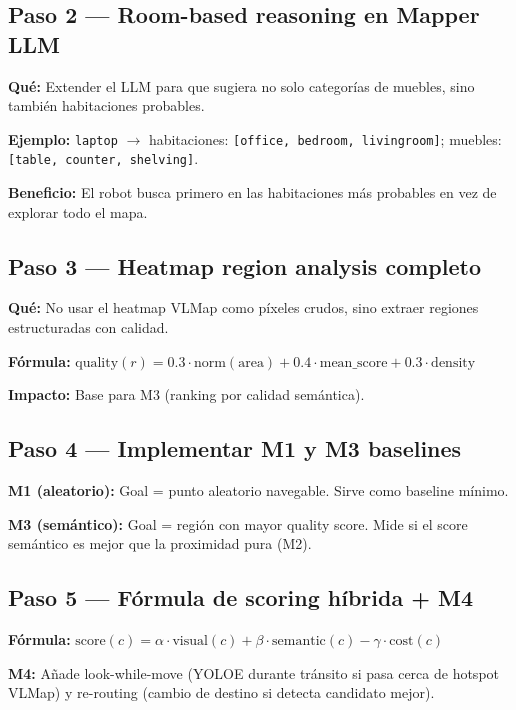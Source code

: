 \documentclass[11pt,a4paper]{article}
\begin{document}
\subsection{Paso 2 --- Room-based reasoning en Mapper LLM}

\textbf{Qué:} Extender el LLM para que sugiera no solo categorías de muebles, sino también habitaciones probables.

\textbf{Ejemplo:} \texttt{laptop} $\rightarrow$ habitaciones: \texttt{[office, bedroom, livingroom]}; muebles: \texttt{[table, counter, shelving]}.

\textbf{Beneficio:} El robot busca primero en las habitaciones más probables en vez de explorar todo el mapa.

\subsection{Paso 3 --- Heatmap region analysis completo}

\textbf{Qué:} No usar el heatmap VLMap como píxeles crudos, sino extraer regiones estructuradas con calidad.

\textbf{Fórmula:} $\text{quality}(r) = 0.3 \cdot \text{norm}(\text{area}) + 0.4 \cdot \text{mean\_score} + 0.3 \cdot \text{density}$

\textbf{Impacto:} Base para M3 (ranking por calidad semántica).

\subsection{Paso 4 --- Implementar M1 y M3 baselines}

\textbf{M1 (aleatorio):} Goal = punto aleatorio navegable. Sirve como baseline mínimo.

\textbf{M3 (semántico):} Goal = región con mayor quality score. Mide si el score semántico es mejor que la proximidad pura (M2).

\subsection{Paso 5 --- Fórmula de scoring híbrida + M4}

\textbf{Fórmula:} $\text{score}(c) = \alpha \cdot \text{visual}(c) + \beta \cdot \text{semantic}(c) - \gamma \cdot \text{cost}(c)$

\textbf{M4:} Añade look-while-move (YOLOE durante tránsito si pasa cerca de hotspot VLMap) y re-routing (cambio de destino si detecta candidato mejor).
\end{document}
